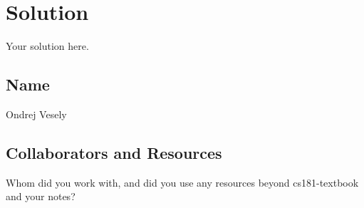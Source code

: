 \documentclass[submit]{../harvardml}
\newenvironment{solution}
  {\color{blue}\section*{Solution}}
{}
\begin{document}
\begin{solution}
	Your solution here.
\end{solution}

\newpage
\newpage
\subsection*{Name}
Ondrej Vesely
\subsection*{Collaborators and Resources}
Whom did you work with, and did you use any resources beyond cs181-textbook and your notes?
\end{document}
